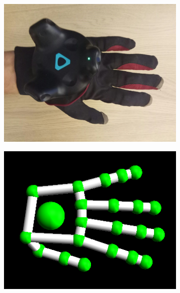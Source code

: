\documentclass[hyperref, bachelorofscience]{cgvpub}
\begin{document}
\begin{figure}[b!]
\begin{subfigure}{.235\linewidth}
		\includegraphics[width=\linewidth]{../pics/hand_dorsal_flat}
	\end{subfigure}
	\hspace{.01cm}
	\begin{subfigure}{.235\linewidth}
		\includegraphics[width=\linewidth]{../pics/model_dorsal_flat}
	\end{subfigure}
	\vspace{.1cm}
	\begin{subfigure}{.235\linewidth}

\end{subfigure}
\end{figure}
\end{document}
